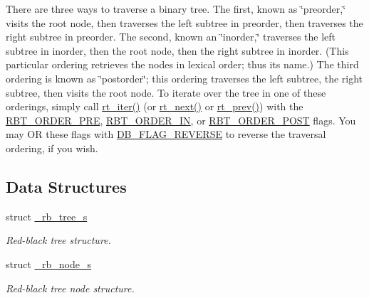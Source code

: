 There are three ways to traverse a binary tree. The first, known as \char`\"{}preorder,\char`\"{} visits the root node, then traverses the left subtree in preorder, then traverses the right subtree in preorder. The second, known an \char`\"{}inorder,\char`\"{} traverses the left subtree in inorder, then the root node, then the right subtree in inorder. (This particular ordering retrieves the nodes in lexical order; thus its name.) The third ordering is known as \char`\"{}postorder\char`\"{}; this ordering traverses the left subtree, the right subtree, then visits the root node. To iterate over the tree in one of these orderings, simply call \hyperlink{group__dbprim__rbtree_ga12}{rt\_\-iter()} (or \hyperlink{group__dbprim__rbtree_ga11}{rt\_\-next()} or \hyperlink{group__dbprim__rbtree_ga29}{rt\_\-prev()}) with the \hyperlink{group__dbprim__rbtree_ga25}{RBT\_\-ORDER\_\-PRE}, \hyperlink{group__dbprim__rbtree_ga26}{RBT\_\-ORDER\_\-IN}, or \hyperlink{group__dbprim__rbtree_ga27}{RBT\_\-ORDER\_\-POST} flags. You may OR these flags with \hyperlink{group__dbprim_ga4}{DB\_\-FLAG\_\-REVERSE} to reverse the traversal ordering, if you wish.

\subsection*{Data Structures}
\begin{CompactItemize}
\item 
struct \hyperlink{struct__rb__tree__s}{\_\-rb\_\-tree\_\-s}
\begin{CompactList}\small\item\em Red-black tree structure. \item\end{CompactList}\item 
struct \hyperlink{struct__rb__node__s}{\_\-rb\_\-node\_\-s}
\begin{CompactList}\small\item\em Red-black tree node structure. \item\end{CompactList}\end{CompactItemize}
